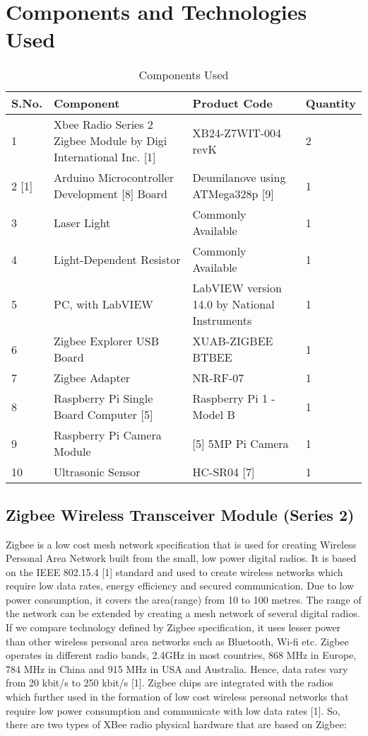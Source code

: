 \documentclass[letterpaper, 10 pt, conference]{ieeeconf}
\begin{document}
\section{Components and Technologies Used}
\begin{table}[h!] [h!]
\centering
\begin{tabular}{|l|p{2 cm}|p{2 cm}|l|} \hline
S.No. &  Component & Product Code & Quantity \\ 
\hline
1 & Xbee Radio Series 2 Zigbee Module by Digi International Inc. [1] & XB24-Z7WIT-004 revK & 2\\\hline
2 [1] & Arduino Microcontroller Development [8] Board & Deumilanove using ATMega328p [9] & 1 \\\hline
3 & Laser Light & Commonly Available & 1 \\\hline
4 & Light-Dependent Resistor & Commonly Available & 1 \\\hline
5 & PC, with LabVIEW & LabVIEW version 14.0 by National Instruments & 1 \\\hline
6 & Zigbee Explorer USB Board & XUAB-ZIGBEE BTBEE & 1\\\hline
7 & Zigbee Adapter & NR-RF-07 & 1 \\\hline
8 & Raspberry Pi Single Board Computer [5] & Raspberry Pi 1 - Model B & 1 \\\hline
9 & Raspberry Pi Camera Module & [5] 5MP Pi Camera & 1 \\\hline
10 & Ultrasonic Sensor & HC-SR04 [7] & 1\\\hline
\end{tabular}
\caption{\label{tab:component}Components Used}
\end{table}

\subsection{Zigbee Wireless Transceiver Module (Series 2)}
Zigbee is a low cost mesh network specification that is used for creating Wireless Personal Area Network built from the small, low power digital radios. It is based on the IEEE 802.15.4 [1] standard and used to create wireless networks which require low data rates, energy efficiency and  secured communication. Due to low power consumption, it covers the area(range) from 10 to 100 metres. The range of the network can be extended by creating a mesh network of several digital radios. If we compare technology defined by Zigbee specification, it uses lesser power than other wireless personal area networks such as Bluetooth, Wi-fi etc. Zigbee operates in different radio bands, 2.4GHz in most countries, 868 MHz in Europe, 784 MHz in China and 915 MHz in USA and Australia. Hence, data rates vary from 20 kbit/s to 250 kbit/s [1]. Zigbee chips are integrated with the radios which further used in the formation of low cost wireless personal networks that require low power consumption and communicate with low data rates [1]. So, there are two types of XBee radio physical hardware that are based on Zigbee:
\end{document}
